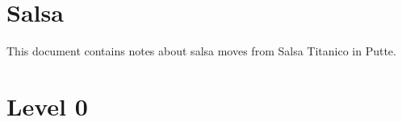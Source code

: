 \documentclass[a4paper, 12pt]{article}
\begin{document}




\newpage


\newpage
\setcounter{page}{1}
\tableofcontents

\newpage
\setcounter{page}{1}

\section{Salsa}
\noindent This document contains notes about salsa moves from Salsa Titanico in Putte.

\section{Level 0}
\newpage

\end{document}
